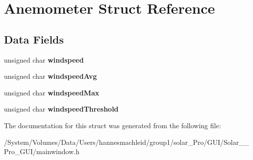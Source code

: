 \hypertarget{struct_anemometer}{}\section{Anemometer Struct Reference}
\label{struct_anemometer}
\subsection*{Data Fields}
\begin{DoxyCompactItemize}
\item 
\mbox{\label{struct_anemometer_ac1ad5650b2eea1df14cc884b1bd6a4f1}} 
unsigned char {\bfseries windspeed}
\item 
\mbox{\label{struct_anemometer_a6955a8276576c08f4826dc0604f4c2f7}} 
unsigned char {\bfseries windspeed\+Avg}
\item 
\mbox{\label{struct_anemometer_ac4488ca47ffb77eba9de595eec6c8788}} 
unsigned char {\bfseries windspeed\+Max}
\item 
\mbox{\label{struct_anemometer_acb0edf7de0d053e3ffd0d88cde1b84c4}} 
unsigned char {\bfseries windspeed\+Threshold}
\end{DoxyCompactItemize}


The documentation for this struct was generated from the following file\+:\begin{DoxyCompactItemize}
\item 
/\+System/\+Volumes/\+Data/\+Users/hannesmachleid/group1/solar\+\_\+\+Pro/\+G\+U\+I/\+Solar\+\_\+\+\_\+\+Pro\+\_\+\+G\+U\+I/mainwindow.\+h\end{DoxyCompactItemize}
